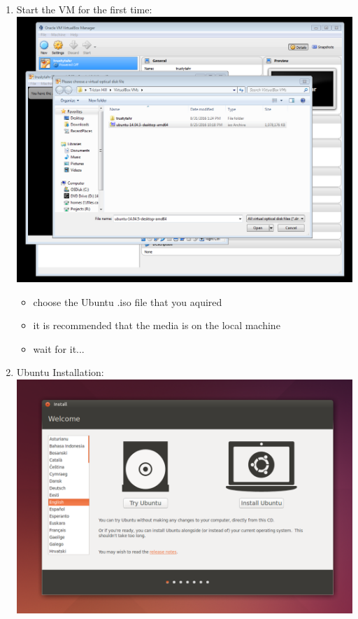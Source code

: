 \documentclass[12pt]{article}
\begin{document}
\begin{description}
\begin{enumerate}
\item Start the VM for the first time: \vspace{20mm} \\
      		\hspace*{-2.5cm}\includegraphics[scale=.6]{Capture9.png} \\
               \begin{itemize}
                    
     
                \item choose the Ubuntu .iso file that you aquired
                \item it is recommended that the media is on the local machine
                \item wait for it...
                
            \end{itemize}


        
	\newpage
\item Ubuntu Installation: \vspace{20mm} \\
      		\hspace*{-2.5cm}\includegraphics[scale=.6]{Capture10.png}
            \begin{itemize}
                    

\end{itemize}
\end{enumerate}
\end{description}
\end{document}
